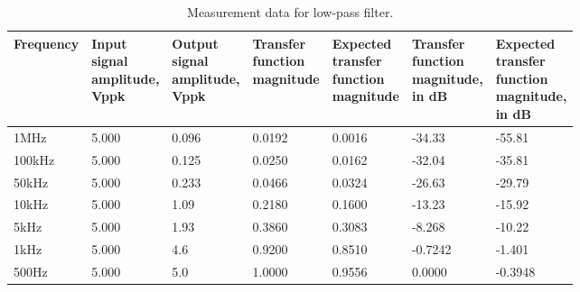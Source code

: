 \begin{table}[H]
	\centering
	\begin{tabular}{|l|l|l|l|l|l|l|}
	\hline
	Frequency&\makecell[l]{Input\\signal\\amplitude,\\Vppk}&\makecell[l]{Output\\signal\\amplitude,\\Vppk}&\makecell[l]{Transfer\\function\\magnitude}&\makecell[l]{Expected\\transfer\\function\\magnitude}&\makecell[l]{Transfer\\function\\magnitude,\\in dB}&\makecell[l]{Expected\\transfer\\function\\magnitude,\\in dB}\\
	\hline
	1MHz&5.000&0.096&0.0192&0.0016&-34.33&-55.81\\
	\hline
	100kHz&5.000&0.125&0.0250&0.0162&-32.04&-35.81\\
	\hline
	50kHz&5.000&0.233&0.0466&0.0324&-26.63&-29.79\\
	\hline
	10kHz&5.000&1.09&0.2180&0.1600&-13.23&-15.92\\
	\hline
	5kHz&5.000&1.93&0.3860&0.3083&-8.268&-10.22\\
	\hline
	1kHz&5.000&4.6&0.9200&0.8510&-0.7242&-1.401\\
	\hline
	500Hz&5.000&5.0&1.0000&0.9556&0.0000&-0.3948\\
	\hline
	\end{tabular}
	\caption{Measurement data for low-pass filter.}
\end{table}
